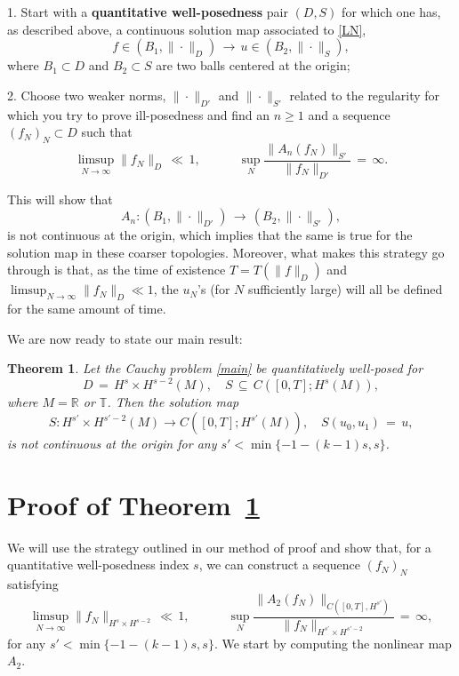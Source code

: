 \documentclass{amsart}
\newtheorem{theorem}{Theorem}[section]
\begin{document}
1. Start with a \textbf{quantitative well-posedness} pair $(D,S)$ for which one has, as described above, a continuous solution map associated to \eqref{LN},
\begin{equation}
f\in (B_1,\|\cdot \|_D)\,\longrightarrow\,u\in (B_2,\|\cdot \|_S),
\end{equation} 
where $B_1\subset D$ and $B_2 \subset S$ are two balls centered at the origin;

2. Choose two weaker norms, $\| \cdot\|_{D'}$ and $\| \cdot\|_{S'}$ related to the regularity for which you try to prove ill-posedness and find an $n\geq 1$ and a sequence $(f_N)_N\subset D$ such that
\begin{equation}
\limsup_{N\to \infty} \|f_N\|_D\,\ll\,1, \qquad \quad \sup_N \frac{\|A_n(f_N)\|_{S'}}{\|f_N\|_{D'}}\,=\,\infty.
\label{ip}
\end{equation}

This will show that 
\begin{equation}
A_n: (B_1,\|\cdot \|_{D'})\,\longrightarrow\,(B_2,\| \cdot\|_{S'}),
\end{equation} 
is not continuous at the origin, which implies that the same is true for the solution map in these coarser  topologies. Moreover, what makes this strategy go through is that, as the time of existence $T=T(\|f\|_D)$ and $\limsup_{N\to \infty} \|f_N\|_D \ll 1$, the $u_N$'s (for $N$ sufficiently large) will all be defined for the same amount of time.


We are now ready to state our main result:

\begin{theorem}
Let the Cauchy problem \eqref{main} be quantitatively well-posed for
\[
D\,=\,H^s \times H^{s-2}(M), \quad S\,\subseteq \,C([0,T]; H^s(M)), \]
where  $M=\mathbb{R}$ or $\mathbb{T}$. Then the solution map
\begin{equation}
S: H^{s'} \times H^{s'-2}(M) \to C([0,T]; H^{s'}(M)), \quad
S(u_0,u_1)\,=\,u,
\label{solmap}
\end{equation}
is not continuous at the origin for any $s'< \min\{-1-(k-1)s, s\}$.
\label{mainth}
\end{theorem}

\section{Proof of Theorem~\ref{mainth}}
We will use the strategy outlined in our method of proof and show that, for a quantitative well-posedness  index $s$, we can construct a sequence $(f_N)_N$ satisfying
\[
\limsup_{N\to \infty} \|f_N\|_{H^s \times H^{s-2}}\,\ll\,1, \qquad \quad \sup_N \frac{\|A_2(f_N)\|_{C([0,T],H^{s'})}}{\|f_N\|_{H^{s'} \times H^{s'-2}}}\,=\,\infty,\]
for any $s'< \min\{-1-(k-1)s, s\}$. We start by computing the nonlinear map $A_2$.
\end{document}
